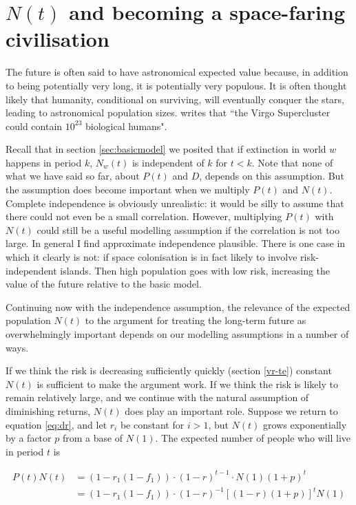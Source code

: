 \documentclass[british]{article}
\begin{document}
\section{$N(t)$ and becoming a space-faring civilisation}\label{nt}
The future is often said to have astronomical expected value because, in
addition to being potentially very long, it is potentially very populous. It is often thought likely that humanity, conditional on surviving, will eventually conquer the stars, leading to astronomical population sizes. \cite{ba} writes that ``the Virgo Supercluster could contain $10^{23}$ biological humans".

Recall that in section \ref{sec:basicmodel} we posited that if extinction in world $w$ happens in period $k$, $N_w(t)$ is independent of $k$ for $t<k$. Note that none of what we have said so far, about $P(t)$ and $D$, depends on this assumption. But the assumption does become important when we multiply $P(t)$ and $N(t)$. Complete independence is obviously unrealistic: it would be silly to assume that there could not even be a small correlation. However, multiplying $P(t)$ with $N(t)$ could still be a useful modelling assumption if the correlation is not too large. In general I find approximate independence plausible. There is one case in which it clearly is not: if space colonisation is in fact likely to involve risk-independent islands. Then high population goes with low risk, increasing the value of the future relative to the basic model.

Continuing now with the independence assumption, the relevance of the expected population $N(t)$ to the argument for treating the long-term future as overwhelmingly important depends on our modelling assumptions in a number of ways.

If we think the risk is decreasing sufficiently quickly (section \ref{vr-te}) constant $N(t)$ is sufficient to make the argument work. If we think the risk is likely to remain relatively large, and we continue with the natural assumption of diminishing returns, $N(t)$ does play an important role. Suppose we return to equation \ref{eq:dr}, and let $r_i$ be constant for $i>1$, but $N(t)$ grows exponentially by a factor $p$ from a base of $N(1)$. The expected number of people who will live in period $t$ is

\begin{equation}
\begin{split}
P(t)N(t) &= (1-r_1(1-f_1)) \cdot (1-r)^{t-1} \cdot N(1)(1+p)^t \label{eq:populationgrowth}\\
         &=  (1-r_1(1-f_1)) \cdot (1-r)^{-1}[(1-r)(1+p)]^{t} N(1)
\end{split}
\end{equation}
\end{document}
